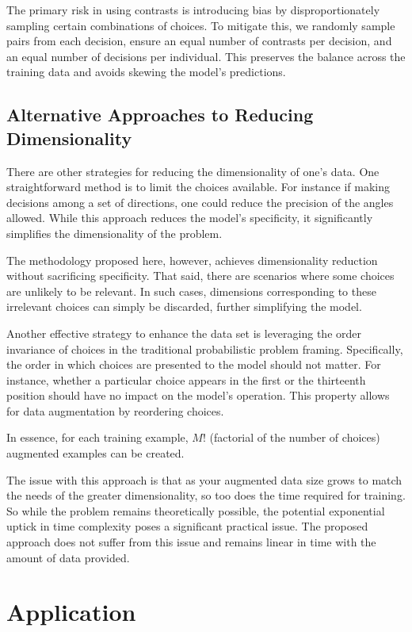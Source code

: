 \documentclass[11pt]{article}
\begin{document}
The primary risk in using contrasts is introducing bias by disproportionately sampling certain combinations of choices. To mitigate this, we randomly sample pairs from each decision, ensure an equal number of contrasts per decision, and an equal number of decisions per individual. This preserves the balance across the training data and avoids skewing the model's predictions.

\subsection*{Alternative Approaches to Reducing Dimensionality}
There are other strategies for reducing the dimensionality of one's data. One straightforward method is to limit the choices available. For instance if making decisions among a set of directions, one could reduce the precision of the angles allowed. While this approach reduces the model's specificity, it significantly simplifies the dimensionality of the problem.

The methodology proposed here, however, achieves dimensionality reduction without sacrificing specificity. That said, there are scenarios where some choices are unlikely to be relevant. In such cases, dimensions corresponding to these irrelevant choices can simply be discarded, further simplifying the model.

Another effective strategy to enhance the data set is leveraging the order invariance of choices in the traditional probabilistic problem framing. Specifically, the order in which choices are presented to the model should not matter. For instance, whether a particular choice appears in the first or the thirteenth position should have no impact on the model's operation. This property allows for data augmentation by reordering choices.

In essence, for each training example, $M!$ (factorial of the number of choices) augmented examples can be created.

The issue with this approach is that as your augmented data size grows to match the needs of the greater dimensionality, so too does the time required for training. So while the problem remains theoretically possible, the potential exponential uptick in time complexity poses a significant practical issue. The proposed approach does not suffer from this issue and remains linear in time with the amount of data provided. 
\section*{Application}
\end{document}
